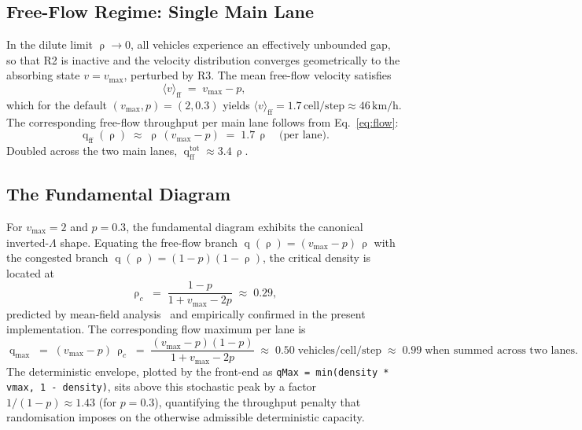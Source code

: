 \documentclass[11pt,a4paper]{article}
\DeclareMathOperator{\flow}{q}
\DeclareMathOperator{\dens}{\rho}
\begin{document}
\subsection{Free-Flow Regime: Single Main Lane}

In the dilute limit $\dens \to 0$, all vehicles experience an
effectively unbounded gap, so that R2 is inactive and the velocity
distribution converges geometrically to the absorbing state
$v=v_{\max}$, perturbed by R3. The mean free-flow velocity satisfies
\begin{equation}
\langle v\rangle_{\text{ff}} \;=\; v_{\max} - p,
\label{eq:vff}
\end{equation}
which for the default $(v_{\max},p)=(2,0.3)$ yields
$\langle v\rangle_{\text{ff}} = 1.7\,\text{cell/step} \approx
46\,\text{km/h}$. The corresponding free-flow throughput per main lane
follows from Eq.~\eqref{eq:flow}:
\begin{equation}
\flow_{\text{ff}}(\dens) \;\approx\; \dens\,(v_{\max}-p) \;=\; 1.7\,\dens
\quad\text{(per lane).}
\label{eq:qff}
\end{equation}
Doubled across the two main lanes,
$\flow_{\text{ff}}^{\text{tot}} \approx 3.4\,\dens$.

\subsection{The Fundamental Diagram}

For $v_{\max}=2$ and $p=0.3$, the fundamental diagram exhibits the
canonical inverted-$\Lambda$ shape. Equating the free-flow branch
$\flow(\dens)=(v_{\max}-p)\,\dens$ with the congested branch
$\flow(\dens)=(1-p)(1-\dens)$, the critical density is located at
\begin{equation}
\dens_c \;=\; \frac{1-p}{1+v_{\max}-2p} \;\approx\; 0.29,
\label{eq:rho_c}
\end{equation}
predicted by mean-field analysis~\cite{schadschneider1997} and
empirically confirmed in the present implementation. The corresponding
flow maximum per lane is
\begin{equation}
\flow_{\max} \;=\; (v_{\max}-p)\,\dens_c
\;=\; \frac{(v_{\max}-p)(1-p)}{1+v_{\max}-2p}
\;\approx\; 0.50\;\text{vehicles/cell/step}
\;\approx\; 0.99\;\text{when summed across two lanes}.
\label{eq:q_max}
\end{equation}
The deterministic envelope, plotted by the front-end as
\verb|qMax = min(density * vmax, 1 - density)|, sits above this
stochastic peak by a factor $1/(1-p)\approx 1.43$ (for $p=0.3$),
quantifying the throughput penalty that randomisation imposes on the
otherwise admissible deterministic capacity.
\end{document}
